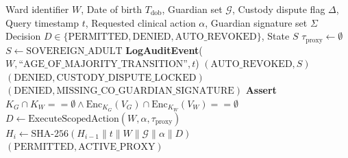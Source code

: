 \documentclass[journal,twocolumn]{IEEEtran}
\begin{document}
\begin{algorithm}[t]
\caption{Zero-Contamination Family Proxy Delegation and Age-of-Majority State Transition}
\label{alg:family_proxy}
\begin{algorithmic}[1]
\REQUIRE Ward identifier $W$, Date of birth $T_{\text{dob}}$, Guardian set $\mathcal{G}$, Custody dispute flag $\Delta$, Query timestamp $t$, Requested clinical action $\alpha$, Guardian signature set $\Sigma$
\ENSURE Decision $D \in \{\text{PERMITTED}, \text{DENIED}, \text{AUTO\_REVOKED}\}$, State $S$
\STATE {}
    \STATE $\tau_{\text{proxy}} \leftarrow \emptyset$
    \STATE $S \leftarrow \text{SOVEREIGN\_ADULT}$
    \STATE \textbf{LogAuditEvent}($W, \text{``AGE\_OF\_MAJORITY\_TRANSITION''}, t$)
    \RETURN $(\text{AUTO\_REVOKED}, S)$
\ENDIF
\STATE {}
    \RETURN $(\text{DENIED}, \text{CUSTODY\_DISPUTE\_LOCKED})$
\ENDIF
\STATE {}
            \RETURN $(\text{DENIED}, \text{MISSING\_CO\_GUARDIAN\_SIGNATURE})$
        \ENDIF
    \ENDFOR
\ENDIF
\STATE {}
\STATE \textbf{Assert} $K_G \cap K_W == \emptyset \land \text{Enc}_{K_G}(V_G) \cap \text{Enc}_{K_W}(V_W) == \emptyset$
\STATE {}
\STATE $D \leftarrow \text{ExecuteScopedAction}(W, \alpha, \tau_{\text{proxy}})$
\STATE $H_i \leftarrow \text{SHA-256}(H_{i-1} \parallel t \parallel W \parallel \mathcal{G} \parallel \alpha \parallel D)$
\RETURN $(\text{PERMITTED}, \text{ACTIVE\_PROXY})$
\end{algorithmic}
\end{algorithm}
\end{document}
